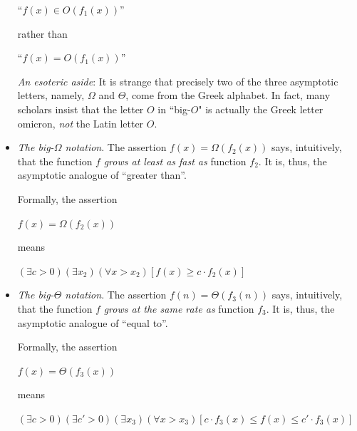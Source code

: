 \begin{itemize}
{\begin{minipage}{0.96\textwidth}
\begin{enumerate}
\smallskip

\hspace*{.25in}``$f(x) \in O(f_1(x))$''

\smallskip

rather than

\smallskip

\hspace*{.25in}``$f(x) =  O(f_1(x))$''
\end{enumerate}

\medskip

{\it An esoteric aside}:  It is strange that precisely two of the three asymptotic letters, namely, $\Omega$ and $\Theta$, come from the Greek alphabet.  In fact, many scholars insist that the letter $O$ in ``big-$O$" is actually the Greek letter omicron, {\em not} the Latin letter $O$.
\end{minipage}
}
\bigskip

\item
{\em The big-$\Omega$ notation}.
The assertion $f(x) = \Omega(f_2(x))$ says, intuitively, that the function $f$ {\em grows at least as fast as} function $f_2$.  It is, thus, the asymptotic analogue of ``greater than''.

\smallskip

Formally, the assertion

\smallskip

\hspace*{.2in}
$f(x) = \Omega(f_2(x))$

means

\hspace*{.2in}
$(\exists c >0)(\exists x_2)(\forall x > x_2)
[f(x) \geq c \cdot  f_2(x)]$

\item
{\em The big-$\Theta$ notation}.
The assertion $f(n) = \Theta(f_3(n))$ says, intuitively, that the function $f$ {\em grows at the same rate as} function $f_3$.  It is, thus, the asymptotic analogue of ``equal to''.

\smallskip

Formally, the assertion

\smallskip

\hspace*{.2in}
$f(x) = \Theta(f_3(x))$

means

\hspace*{.2in}
$(\exists c >0)(\exists c' >0)(\exists x_{3})(\forall x > x_{3})
[c \cdot f_3(x) \leq f(x) \leq c' \cdot  f_3(x)]$
\end{itemize}
